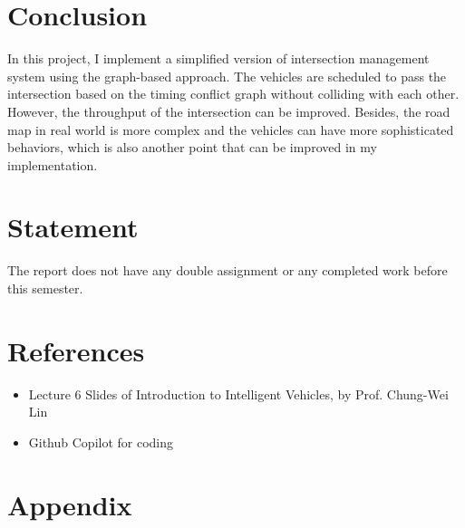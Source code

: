 \documentclass{article}
\begin{document}
\begin{multicols*}{2}
    

    \section{Conclusion}
    In this project, I implement a simplified version of intersection management system using the graph-based approach. The vehicles are scheduled to pass the intersection based on the timing conflict graph without colliding with each other. However, the throughput of the intersection can be improved. Besides, the road map in real world is more complex and the vehicles can have more sophisticated behaviors, which is also another point that can be improved in my implementation.

    \section*{Statement}
    The report does not have any double assignment or any completed work before this semester.

    \section*{References}
    \begin{itemize}[itemsep=0pt, leftmargin=*]
        \item Lecture 6 Slides of Introduction to Intelligent Vehicles, by Prof. Chung-Wei Lin
        \item Github Copilot for coding
    \end{itemize}
\end{multicols*}

\newpage
\section*{Appendix}
\end{document}
